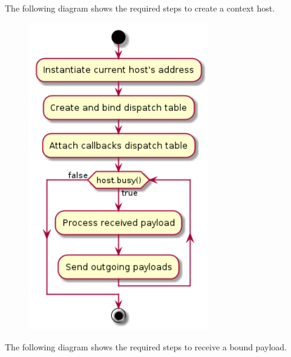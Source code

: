 \documentclass[12pt]{report}
\begin{document}
                \newpage
                The following diagram shows the required steps to create a context host.

                \begin{figure}[H]
                \centering
                \includegraphics[width=0.7\textwidth]{d/ac/conthost.png}
                \end{figure}





                \newpage
                The following diagram shows the required steps to receive a bound payload.
\end{document}
